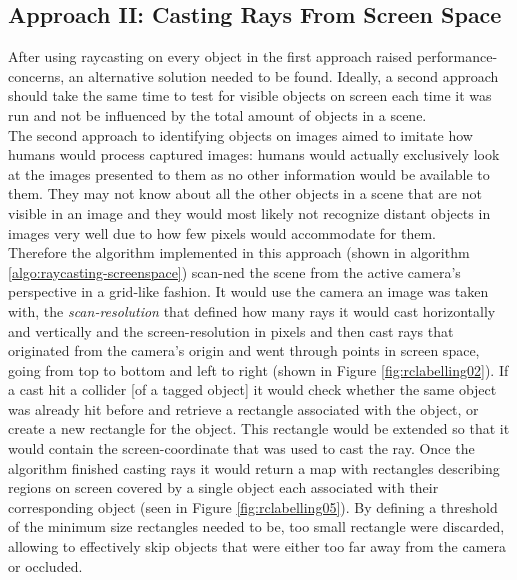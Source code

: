 \subsection{Approach II: Casting Rays From Screen Space}
After using raycasting on every object in the first approach raised performance-concerns, an alternative solution needed to be found. Ideally, a second approach should take the same time to test for visible objects on screen each time it was run and not be influenced by the total amount of objects in a scene.\\
The second approach to identifying objects on images aimed to imitate how humans would process captured images: humans would actually exclusively look at the images presented to them as no other information would be available to them. They may not know about all the other objects in a scene that are not visible in an image and they would most likely not recognize distant objects in images very well due to how few pixels would accommodate for them.\\
Therefore the algorithm implemented in this approach (shown in algorithm \ref{algo:raycasting-screenspace}) scan-ned the scene from the active camera's perspective in a grid-like fashion. It would use the camera an image was taken with, the \emph{scan-resolution} that defined how many rays it would cast horizontally and vertically and the screen-resolution in pixels and then cast rays that originated from the camera's origin and went through points in screen space, going from top to bottom and left to right (shown in Figure \ref{fig:rclabelling02}). If a cast hit a collider [of a tagged object] it would check whether the same object was already hit before and retrieve a rectangle associated with the object, or create a new rectangle for the object. This rectangle would be extended so that it would contain the screen-coordinate that was used to cast the ray. Once the algorithm finished casting rays it would return a map with rectangles describing regions on screen covered by a single object each associated with their corresponding object (seen in Figure \ref{fig:rclabelling05}). By defining a threshold of the minimum size rectangles needed to be, too small rectangle were discarded, allowing to effectively skip objects that were either too far away from the camera or occluded.\\
